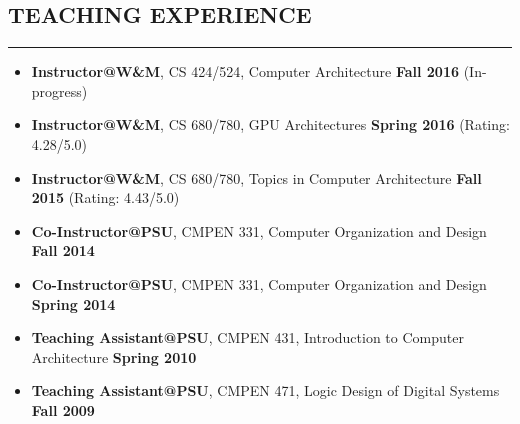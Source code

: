 \documentclass[10pt,a4]{article}
\begin{document}
\subsection*{TEACHING EXPERIENCE}
\hrule
\vspace{0.2cm}
\begin{itemize}
\item{\bf Instructor@W\&M}, CS 424/524, Computer Architecture \hfill {\bf Fall 2016}  (In-progress)
\item{\bf Instructor@W\&M}, CS 680/780, GPU Architectures \hfill {\bf Spring 2016}  (Rating: 4.28/5.0)
\item{\bf Instructor@W\&M}, CS 680/780, Topics in Computer Architecture \hfill {\bf Fall 2015} (Rating: 4.43/5.0)
\item{\bf Co-Instructor@PSU}, CMPEN 331, Computer Organization and Design \hfill {\bf Fall 2014} 
\item{\bf Co-Instructor@PSU}, CMPEN 331, Computer Organization and Design \hfill {\bf Spring 2014} 
\item{\bf Teaching Assistant@PSU}, CMPEN 431, Introduction to Computer Architecture  \hfill {\bf Spring 2010} 
\item{\bf Teaching Assistant@PSU}, CMPEN 471, Logic Design of Digital Systems  \hfill {\bf Fall 2009} 
\end{itemize}
\end{document}
